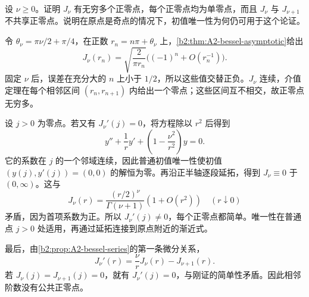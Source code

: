 \begin{exercise}\label{b2:ex:A2-zeros}
设 \(\nu\geq0\)。证明 \(J_\nu\) 有无穷多个正零点，每个正零点均为单零点，而且 \(J_\nu\) 与 \(J_{\nu+1}\) 不共享正零点。说明在原点是奇点的情况下，初值唯一性为何仍可用于这个论证。
\end{exercise}
\begin{solution}
令 \(\theta_\nu=\pi\nu/2+\pi/4\)，在正数
\(r_n=n\pi+\theta_\nu\) 上，\cref{b2:thm:A2-bessel-asymptotic}给出
\[
 J_\nu(r_n)
 =\sqrt{\frac2{\pi r_n}}\bigl((-1)^n+O(r_n^{-1})\bigr).
\]
固定 \(\nu\) 后，误差在充分大的 \(n\) 上小于 \(1/2\)，所以这些值交替正负。\(J_\nu\) 连续，介值定理在每个相邻区间
\((r_n,r_{n+1})\) 内给出一个零点；这些区间互不相交，故正零点无穷多。

设 \(j>0\) 为零点。若又有 \(J_\nu'(j)=0\)，将方程除以 \(r^2\) 后得到
\[
 y''+\frac1r y'
       +\left(1-\frac{\nu^2}{r^2}\right)y=0.
\]
它的系数在 \(j\) 的一个邻域连续，因此普通初值唯一性使初值
\((y(j),y'(j))=(0,0)\) 的解恒为零。再沿正半轴逐段延拓，得到
\(J_\nu\equiv0\) 于 \((0,\infty)\)。这与
\[
 J_\nu(r)
 =\frac{(r/2)^\nu}{\Gamma(\nu+1)}(1+O(r^2))
 \quad(r\downarrow0)
\]
矛盾，因为首项系数为正。所以 \(J_\nu'(j)\ne0\)，每个正零点都简单。唯一性在普通点 \(j>0\) 处适用，再通过延拓连接到原点附近的渐近式。

最后，由\cref{b2:prop:A2-bessel-series}的第一条微分关系，
\[
 J_\nu'(r)=\frac{\nu}{r}J_\nu(r)-J_{\nu+1}(r).
\]
若 \(J_\nu(j)=J_{\nu+1}(j)=0\)，就有 \(J_\nu'(j)=0\)，与刚证的简单性矛盾。因此相邻阶数没有公共正零点。
\end{solution}

